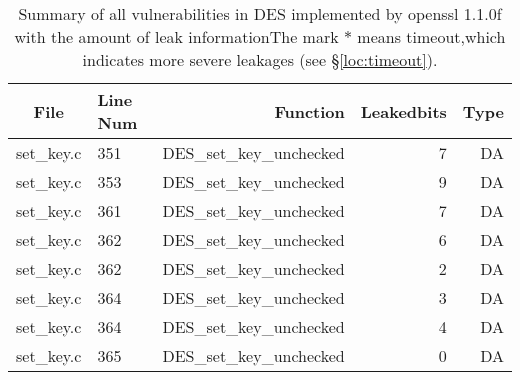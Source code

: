 \begin{table*}%
\centering
\caption{Summary of all vulnerabilities in DES implemented by openssl 1.1.0f with the amount of leak informationThe mark $*$ means timeout,which indicates more severe leakages (see \S\ref{loc:timeout}).}\label{tab:DESopenssl}
\begin{tabular}{clrrr}
\hline
\textbf{File} & \textbf{Line Num} & \textbf{Function} & \textbf{Leakedbits} & \textbf{Type} \\\hline
set\_key.c&351&DES\_set\_key\_unchecked&7 &DA\\
set\_key.c&353&DES\_set\_key\_unchecked&9 &DA\\
set\_key.c&361&DES\_set\_key\_unchecked&7 &DA\\
set\_key.c&362&DES\_set\_key\_unchecked&6 &DA\\
set\_key.c&362&DES\_set\_key\_unchecked&2 &DA\\
set\_key.c&364&DES\_set\_key\_unchecked&3 &DA\\
set\_key.c&364&DES\_set\_key\_unchecked&4 &DA\\
set\_key.c&365&DES\_set\_key\_unchecked&0 &DA\\
\hline
\end{tabular}
\end{table*}